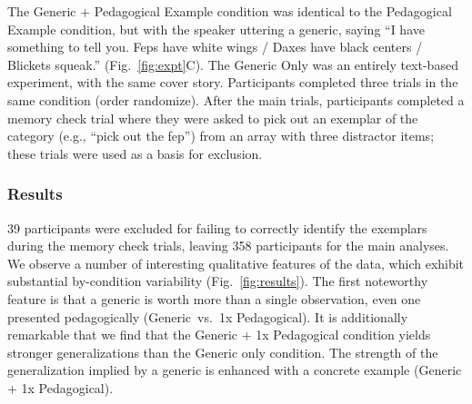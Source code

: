 \documentclass[10pt,letterpaper]{article}
\begin{document}
The Generic + Pedagogical Example condition was identical to the Pedagogical Example condition, but with the speaker uttering a generic, saying ``I have something to tell you. Feps have white wings / Daxes have black centers / Blickets squeak.'' (Fig.~\ref{fig:expt}C). 
The Generic Only was an entirely text-based experiment, with the same cover story. 
Participants completed three trials in the same condition (order randomize).
After the main trials, participants completed a memory check trial where they were asked to pick out an exemplar of the category (e.g., ``pick out the fep'') from an array with three distractor items; these trials were used as a basis for exclusion.










\subsubsection{Results}



39 participants were excluded for failing to correctly identify the exemplars during the memory check trials, leaving 358 participants for the main analyses.
We observe a number of interesting qualitative features of the data, which exhibit substantial by-condition variability (Fig.~\ref{fig:results}). 
The first noteworthy feature is that a generic is worth more than a single observation, even one presented pedagogically (Generic~vs.~1x Pedagogical). 
It is additionally remarkable that we find that the Generic + 1x Pedagogical condition yields stronger generalizations than the Generic only condition. 
The strength of the generalization implied by a generic is enhanced with a concrete example (Generic + 1x Pedagogical). 
\end{document}
